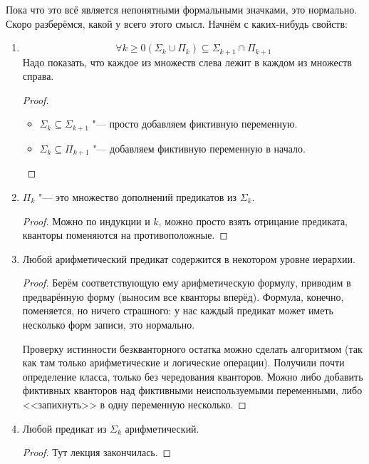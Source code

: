 Пока что это всё является непонятными формальными значками, это нормально.
Скоро разберёмся, какой у всего этого смысл.
Начнём с каких-нибудь свойств:

\begin{enumerate}
\item
	\[ \forall k \ge 0 (\Sigma_k \cup \Pi_k) \subseteq \Sigma_{k+1} \cap \Pi_{k+1} \]
	Надо показать, что каждое из множеств слева лежит в каждом из множеств справа.

	\begin{proof}
		\begin{itemize}
		\item $\Sigma_k \subseteq \Sigma_{k+1}$ "--- просто добавляем фиктивную переменную. \TODO
		\item $\Sigma_k \subseteq \Pi_{k+1}$ "--- добавляем фиктивную переменную в начало. \TODO
		\end{itemize}
	\end{proof}

\item
	$\Pi_k$ "--- это множество дополнений предикатов из $\Sigma_k$.
	\begin{proof}
		Можно по индукции и $k$, можно просто взять отрицание предиката, кванторы поменяются на противоположные.
	\end{proof}

\item
	Любой арифметический предикат содержится в некотором уровне иерархии.
	\begin{proof}
		Берём соответствующую ему арифметическую формулу, приводим в предварённую
		форму (выносим все кванторы вперёд).
		Формула, конечно, поменяется, но ничего страшного: у нас каждый предикат может иметь несколько
		форм записи, это нормально.

		Проверку истинности безкванторного остатка можно сделать алгоритмом (так как там только
		арифметические и логические операции).
		Получили почти определение класса, только без чередования кванторов.
		Можно либо добавить фиктивных кванторов над фиктивными неиспользуемыми переменными,
		либо <<запихнуть>> в одну переменную несколько.
	\end{proof}

\item
	Любой предикат из $\Sigma_k$ арифметический.
	\begin{proof}
		Тут лекция закончилась.
	\end{proof}
\end{enumerate}
